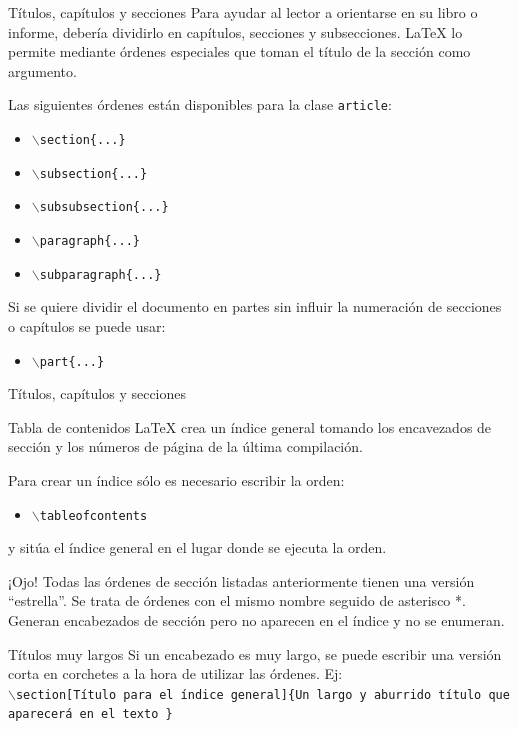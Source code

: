 \documentclass[10pt]{beamer}
\begin{document}
\begin{frame}{Títulos, capítulos y secciones}
Para ayudar al lector a orientarse en su libro o informe, debería dividirlo en capítulos, secciones y subsecciones. \LaTeX{} lo permite mediante órdenes especiales que toman el título de la sección como argumento.

Las siguientes órdenes están disponibles para la clase \texttt{article}: \\
\begin{itemize}
\item \texttt{$\backslash$section\{...\}} \\
\item \texttt{$\backslash$subsection\{...\}} \\
\item \texttt{$\backslash$subsubsection\{...\}} \\
\item \texttt{$\backslash$paragraph\{...\}} \\
\item \texttt{$\backslash$subparagraph\{...\}}
\end{itemize}
Si se quiere dividir el documento en partes sin influir la numeración de secciones o capítulos se puede usar:
\begin{itemize}
\item \texttt{$\backslash$part\{...\}}
\end{itemize}
\end{frame}

\begin{frame}{Títulos, capítulos y secciones}
\begin{block}{Tabla de contenidos}
\LaTeX{} crea un índice general tomando los encavezados de sección y los números de página de la última compilación.

Para crear un índice sólo es necesario escribir la orden:
\begin{itemize}
\item \texttt{$\backslash$tableofcontents}
\end{itemize}
y sitúa el índice general en el lugar donde se ejecuta la orden.
\end{block}

\begin{alertblock}{¡Ojo!}
Todas las órdenes de sección listadas anteriormente tienen una versión ``estrella''. Se trata de órdenes con el mismo nombre seguido de asterisco *. Generan encabezados de sección pero no aparecen en el índice y no se enumeran.
\end{alertblock}

\begin{alertblock}{Títulos muy largos}
Si un encabezado es muy largo, se puede escribir una versión corta en corchetes a la hora de utilizar las órdenes. Ej: \\
\texttt{$\backslash$section[Título para el índice general]\{Un largo y aburrido título que aparecerá en el texto \}}
\end{alertblock}
\end{frame}
\end{document}
